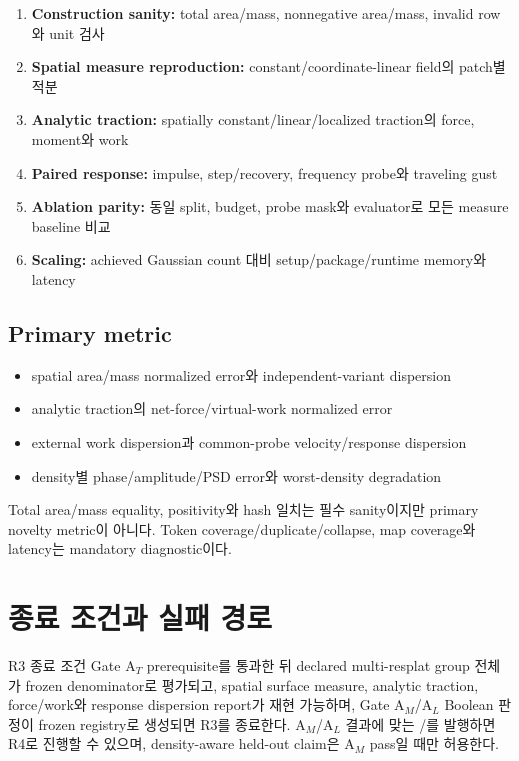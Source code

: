 \documentclass[10pt,a4paper]{article}
\begin{document}
\begin{enumerate}
  \item \textbf{Construction sanity:} total area/mass, nonnegative area/mass, invalid row와 unit 검사
  \item \textbf{Spatial measure reproduction:} constant/coordinate-linear field의 patch별 적분
  \item \textbf{Analytic traction:} spatially constant/linear/localized traction의 force, moment와 work
  \item \textbf{Paired response:} impulse, step/recovery, frequency probe와 traveling gust
  \item \textbf{Ablation parity:} 동일 split, budget, probe mask와 evaluator로 모든 measure baseline 비교
  \item \textbf{Scaling:} achieved Gaussian count 대비 setup/package/runtime memory와 latency
\end{enumerate}

\subsection{Primary metric}

\begin{itemize}
  \item spatial area/mass normalized error와 independent-variant dispersion
  \item analytic traction의 net-force/virtual-work normalized error
  \item external work dispersion과 common-probe velocity/response dispersion
  \item density별 phase/amplitude/PSD error와 worst-density degradation
\end{itemize}

Total area/mass equality, positivity와 hash 일치는 필수 sanity이지만 primary novelty metric이 아니다.
Token coverage/duplicate/collapse, map coverage와 latency는 mandatory diagnostic이다.

\section{종료 조건과 실패 경로}
\label{sec:r3-chapter-8}

\begin{contractbox}{R3 종료 조건}
Gate A\(_T\) prerequisite를 통과한 뒤 declared multi-resplat group 전체가 frozen denominator로 평가되고,
spatial surface measure, analytic traction, force/work와 response dispersion report가 재현 가능하며,
Gate A\(_M\)/A\(_L\) Boolean 판정이 frozen registry로 생성되면 R3를 종료한다.
A\(_M\)/A\(_L\) 결과에 맞는 /를 발행하면 R4로 진행할 수 있으며,
density-aware held-out claim은 A\(_M\) pass일 때만 허용한다.
\end{contractbox}
\end{document}
